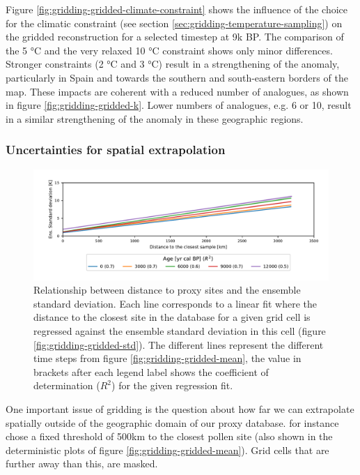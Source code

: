 \begin{refsection}
Figure \ref{fig:gridding-gridded-climate-constraint} shows the influence of the choice for the climatic constraint (see section \ref{sec:gridding-temperature-sampling}) on the gridded reconstruction for a selected timestep at 9k BP. The comparison of the 5 °C and the very relaxed 10 °C constraint shows only minor differences. Stronger constraints (2 °C and 3 °C) result in a strengthening of the anomaly, particularly in Spain and towards the southern and south-eastern borders of the map. These impacts are coherent with a reduced number of analogues, as shown in figure \ref{fig:gridding-gridded-k}. Lower numbers of analogues, e.g. 6 or 10, result in a similar strengthening of the anomaly in these geographic regions.


\subsubsection{Uncertainties for spatial extrapolation}

\begin{figure}
	\includegraphics[width=\linewidth]{gridding-figures/distance-std-relation.pdf}
	\caption[Relationship between distance to proxy sites and ensemble standard deviation]{Relationship between distance to proxy sites and the ensemble standard deviation. Each line corresponds to a linear fit where the distance to the closest site in the database for a given grid cell is regressed against the ensemble standard deviation in this cell (figure \ref{fig:gridding-gridded-std}). The different lines represent the different time steps from figure \ref{fig:gridding-gridded-mean}, the value in brackets after each legend label shows the coefficient of determination ($R^2$) for the given regression fit.}
	\label{fig:gridding-dist-std}
\end{figure}

One important issue of gridding is the question about how far we can extrapolate spatially outside of the geographic domain of our proxy database. \cite{MauriDavisCollinsEtAl2015} for instance chose a fixed threshold of 500km to the closest pollen site (also shown in the deterministic plots of figure \ref{fig:gridding-gridded-mean}). Grid cells that are further away than this, are masked.


\end{refsection}
